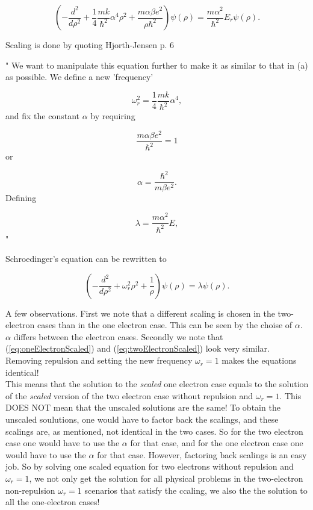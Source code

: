 \documentclass{article}
\begin{document}
\begin{equation}\label{eq:twoElectronIntermediate}
\left(-\frac{d^2}{d\rho^2} 
+ \frac{1}{4}\frac{mk}{\hbar^2} \alpha^4\rho^2+\frac{m\alpha \beta e^2}{\rho\hbar^2}\right)\psi(\rho)    = 
\frac{m\alpha^2}{\hbar^2}E_r \psi(\rho) .
\end{equation}

Scaling is done by quoting Hjorth-Jensen \cite{MHJProject2}  p. 6 

"
We want to manipulate this equation further to make it as similar to that in (a)
as possible. We define a new 'frequency'

\begin{equation*}
\omega_r^2=\frac{1}{4}\frac{mk}{\hbar^2} \alpha^4,
\end{equation*}
and fix the constant $\alpha$ by requiring

\begin{equation*}
\frac{m\alpha \beta e^2}{\hbar^2}=1
\end{equation*}
or

\begin{equation*}
\alpha = \frac{\hbar^2}{m\beta e^2}.
\end{equation*}
Defining

\begin{equation*}
\lambda = \frac{m\alpha^2}{\hbar^2}E,
\end{equation*}"

Schroedinger's equation can be rewritten to

\begin{equation}\label{eq:twoElectronScaled}
\left(-\frac{d^2}{d\rho^2} + \omega_r^2\rho^2 +\frac{1}{\rho}\right)\psi(\rho) = \lambda \psi(\rho).
\end{equation}


A few observations. First we note that a different scaling is chosen in the two-electron cases than in the one electron case. This can be seen by the choise of $\alpha$. $\alpha$ differs between the electron cases. Secondly we note that (\ref{eq:oneElectronScaled}) and (\ref{eq:twoElectronScaled}) look very similar. Removing repulsion and setting the new frequency $\omega_r=1$ makes the equations identical!\\

This means that the solution to the \textit{scaled} one electron case equals to the solution of the \textit{scaled} version of the two electron case without repulsion and $\omega_r = 1$. This DOES NOT mean that the unscaled solutions are the same! To obtain the unscaled soulutions, one would have to factor back the scalings, and these scalings are, as mentioned, not identical in the two cases. So for the two electron case one would have to use the $\alpha$ for that case, and for the one electron case one would have to use the $\alpha$ for that case. However, factoring back scalings is an easy job. So by solving one scaled equation for two electrons without repulsion and $\omega_r = 1$, we not only get the solution for all physical problems in the two-electron non-repulsion $\omega_r = 1$ scenarios that satisfy the ccaling, we also the the solution to all the one-electron cases!\\
\end{document}
